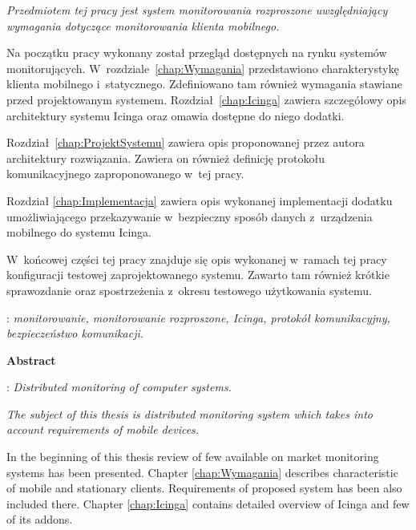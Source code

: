 \begin{titlepage}
    {\itshape Przedmiotem tej pracy jest system monitorowania
      rozproszone uwzględniający wymagania dotyczące monitorowania
      klienta mobilnego.

      \indent Na początku pracy wykonany został przegląd dostępnych na
      rynku systemów monitorujących. W~rozdziale~\ref{chap:Wymagania}
      przedstawiono charakterystykę klienta mobilnego
      i~statycznego. Zdefiniowano tam również wymagania stawiane przed
      projektowanym systemem. Rozdział~\ref{chap:Icinga} zawiera
      szczegółowy opis architektury systemu Icinga oraz omawia
      dostępne do niego dodatki.

      \indent Rozdział~\ref{chap:ProjektSystemu} zawiera opis
      proponowanej przez autora architektury rozwiązania. Zawiera on
      również definicję protokołu komunikacyjnego zaproponowanego
      w~tej pracy.

      \indent Rozdział \ref{chap:Implementacja} zawiera opis wykonanej
      implementacji dodatku umożliwiającego przekazywanie w~bezpieczny
      sposób danych z~urządzenia mobilnego do systemu Icinga.

      \indent W~końcowej części tej pracy znajduje się opis wykonanej
      w~ramach tej pracy konfiguracji testowej zaprojektowanego
      systemu. Zawarto tam również krótkie sprawozdanie oraz
      spostrzeżenia z~okresu testowego użytkowania
      systemu.}\vspace*{1\baselineskip}

    : {\itshape monitorowanie,
      monitorowanie rozproszone, Icinga, protokół komunikacyjny, bezpieczeństwo komunikacji.}
    \par
    \vspace{4\baselineskip}
    \begin{center}
	{\large\bfseries Abstract}\par\bigskip
    \end{center}
    : {\itshape Distributed monitoring of computer
      systems.}\par
    \vspace*{1\baselineskip} {\itshape The subject of this thesis is
      distributed monitoring system which takes into account
      requirements of mobile devices.

      \indent In the beginning of this thesis review of few available
      on market monitoring systems has been presented. Chapter
      \ref{chap:Wymagania} describes characteristic of mobile and
      stationary clients. Requirements of proposed system has been
      also included there. Chapter \ref{chap:Icinga} contains detailed
      overview of Icinga and few of its addons.

}
\end{titlepage}

